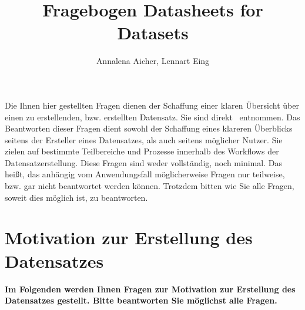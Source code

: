 \documentclass{article}
\title{Fragebogen \glqq Datasheets for Datasets\nocite{gebruDatasheetsDatasets2021}\grqq}
\author{Annalena Aicher, Lennart Eing}
\begin{document}
\maketitle
Die Ihnen hier gestellten Fragen dienen der Schaffung einer klaren Übersicht über einen zu erstellenden, bzw. erstellten Datensatz.
Sie sind direkt~\cite{gebruDatasheetsDatasets2021} entnommen.
Das Beantworten dieser Fragen dient sowohl der Schaffung eines klareren Überblicks seitens der Ersteller eines Datensatzes, als auch seitens möglicher Nutzer.
Sie zielen auf bestimmte Teilbereiche und Prozesse innerhalb des Workflows der Datensatzerstellung.
Diese Fragen sind weder vollständig, noch minimal.
Das heißt, das anhängig vom Anwendungsfall möglicherweise Fragen nur teilweise, bzw. gar nicht beantwortet werden können.
Trotzdem bitten wie Sie alle Fragen, soweit dies möglich ist, zu beantworten.
\section{Motivation zur Erstellung des Datensatzes}
\textbf{Im Folgenden werden Ihnen Fragen zur Motivation zur Erstellung des Datensatzes gestellt. Bitte beantworten Sie möglichst alle Fragen.}
\begin{Form}
\end{Form}
\end{document}

